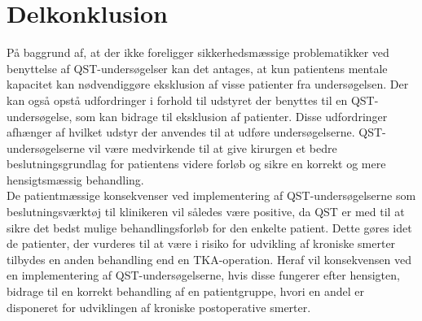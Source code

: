 \section{Delkonklusion}
På baggrund af, at der ikke foreligger sikkerhedsmæssige problematikker ved benyttelse af QST-undersøgelser kan det antages, at kun patientens mentale kapacitet kan nødvendiggøre eksklusion af visse patienter fra undersøgelsen. Der kan også opstå udfordringer i forhold til udstyret der benyttes til en QST-undersøgelse, som kan bidrage til eksklusion af patienter. Disse udfordringer afhænger af hvilket udstyr der anvendes til at udføre undersøgelserne. QST-undersøgelserne vil være medvirkende til at give kirurgen et bedre beslutningsgrundlag for patientens videre forløb og sikre en korrekt og mere hensigtsmæssig behandling. \\
De patientmæssige konsekvenser ved implementering af QST-undersøgelserne som beslutningsværktøj til klinikeren vil således være positive, da QST er med til at sikre det bedst mulige behandlingsforløb for den enkelte patient. Dette gøres idet de patienter, der vurderes til at være i risiko for udvikling af kroniske smerter tilbydes en anden behandling end en TKA-operation. Heraf vil konsekvensen ved en implementering af QST-undersøgelserne, hvis disse fungerer efter hensigten, bidrage til en korrekt behandling af en patientgruppe, hvori en andel er disponeret for udviklingen af kroniske postoperative smerter.


